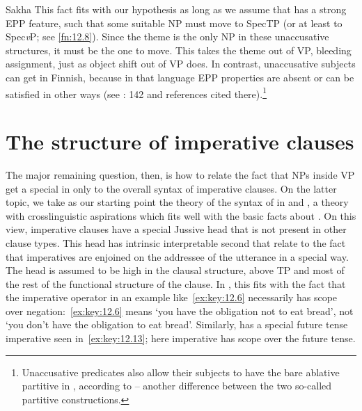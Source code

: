 \documentclass[output=paper]{langsci/langscibook}
\begin{document}
\ea\label{ex:key:12.12}Sakha
	\z
\z
This fact fits with our hypothesis as long as we assume that  has a
strong \gls{EPP} feature, such that some suitable NP must move to
SpecTP (or at least to Spec\emph{v}\textsubscript{\Imp}P; see \cref{fn:12.8}).
Since the theme is the only NP in these unaccusative structures, it must be the
one to move. This takes the theme out of VP, bleeding 
assignment, just as object shift out of VP does.  In contrast, unaccusative
subjects can get  in Finnish, because in that language EPP
properties are absent or can be satisfied in other ways (see
\citealt{Baker2015}: 142 and references cited there).\footnote{Unaccusative
    predicates also allow their subjects to have the bare ablative partitive in
    , according to \textcite{Kornfilt1990,Kornfilt1996} -- another
difference between the two so-called partitive constructions.}

\section{The structure of imperative clauses}

The major remaining question, then, is how to relate the fact that NPs inside
VP get a special  in  only to the overall syntax of
imperative clauses. On the latter topic, we take as our starting point the
theory of the syntax of  in \citet{Zanuttini2008} and
\citet{ZanPakPor2012}, a theory with crosslinguistic aspirations which fits
well with the basic facts about . On this view, imperative clauses have a
special Jussive head that is not present in other clause types. This head has
intrinsic interpretable second  that relate to the fact that
imperatives are enjoined on the addressee of the utterance in a special way.
The head is assumed to be high in the clausal structure, above TP and most of
the rest of the functional structure of the clause. In , this fits with
the fact that the imperative operator in an example like~\eqref{ex:key:12.6} necessarily has
scope over negation:~\eqref{ex:key:12.6} means ‘you have the obligation not to eat bread’, not
‘you don’t have the obligation to eat bread’. Similarly,  has a special
future tense imperative seen in~\eqref{ex:key:12.13}; here imperative has scope over the future
tense.
\end{document}
